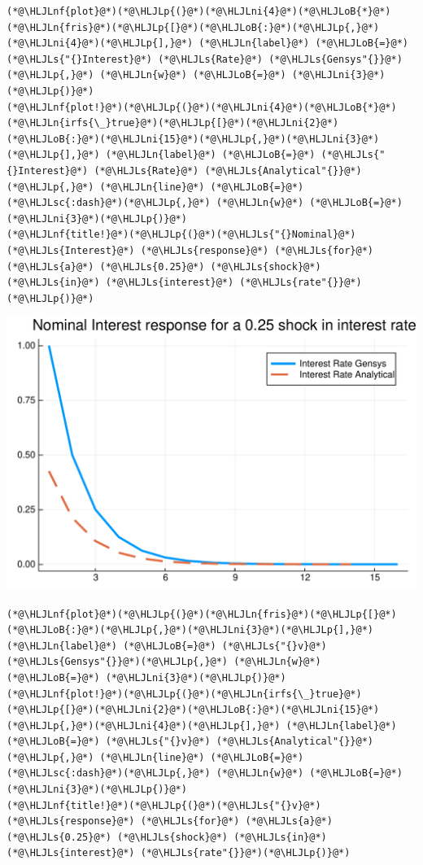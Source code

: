 \documentclass[12pt,a4paper]{article}
\newcommand{\HLJLn}[1]{#1}
\newcommand{\HLJLnf}[1]{\textcolor[RGB]{66,102,213}{#1}}
\newcommand{\HLJLs}[1]{\textcolor[RGB]{201,61,57}{#1}}
\newcommand{\HLJLsc}[1]{\textcolor[RGB]{201,61,57}{#1}}
\newcommand{\HLJLni}[1]{\textcolor[RGB]{59,151,46}{#1}}
\newcommand{\HLJLoB}[1]{\textcolor[RGB]{102,102,102}{\textbf{#1}}}
\newcommand{\HLJLp}[1]{#1}
\begin{document}
\begin{lstlisting}
(*@\HLJLnf{plot}@*)(*@\HLJLp{(}@*)(*@\HLJLni{4}@*)(*@\HLJLoB{*}@*)(*@\HLJLn{fris}@*)(*@\HLJLp{[}@*)(*@\HLJLoB{:}@*)(*@\HLJLp{,}@*)(*@\HLJLni{4}@*)(*@\HLJLp{],}@*) (*@\HLJLn{label}@*) (*@\HLJLoB{=}@*) (*@\HLJLs{"{}Interest}@*) (*@\HLJLs{Rate}@*) (*@\HLJLs{Gensys"{}}@*)(*@\HLJLp{,}@*) (*@\HLJLn{w}@*) (*@\HLJLoB{=}@*) (*@\HLJLni{3}@*)(*@\HLJLp{)}@*)
(*@\HLJLnf{plot!}@*)(*@\HLJLp{(}@*)(*@\HLJLni{4}@*)(*@\HLJLoB{*}@*)(*@\HLJLn{irfs{\_}true}@*)(*@\HLJLp{[}@*)(*@\HLJLni{2}@*)(*@\HLJLoB{:}@*)(*@\HLJLni{15}@*)(*@\HLJLp{,}@*)(*@\HLJLni{3}@*)(*@\HLJLp{],}@*) (*@\HLJLn{label}@*) (*@\HLJLoB{=}@*) (*@\HLJLs{"{}Interest}@*) (*@\HLJLs{Rate}@*) (*@\HLJLs{Analytical"{}}@*)(*@\HLJLp{,}@*) (*@\HLJLn{line}@*) (*@\HLJLoB{=}@*) (*@\HLJLsc{:dash}@*)(*@\HLJLp{,}@*) (*@\HLJLn{w}@*) (*@\HLJLoB{=}@*) (*@\HLJLni{3}@*)(*@\HLJLp{)}@*)
(*@\HLJLnf{title!}@*)(*@\HLJLp{(}@*)(*@\HLJLs{"{}Nominal}@*) (*@\HLJLs{Interest}@*) (*@\HLJLs{response}@*) (*@\HLJLs{for}@*) (*@\HLJLs{a}@*) (*@\HLJLs{0.25}@*) (*@\HLJLs{shock}@*) (*@\HLJLs{in}@*) (*@\HLJLs{interest}@*) (*@\HLJLs{rate"{}}@*)(*@\HLJLp{)}@*)
\end{lstlisting}

\includegraphics[width=\linewidth]{figures/gensys_22_1.pdf}

\begin{lstlisting}
(*@\HLJLnf{plot}@*)(*@\HLJLp{(}@*)(*@\HLJLn{fris}@*)(*@\HLJLp{[}@*)(*@\HLJLoB{:}@*)(*@\HLJLp{,}@*)(*@\HLJLni{3}@*)(*@\HLJLp{],}@*) (*@\HLJLn{label}@*) (*@\HLJLoB{=}@*) (*@\HLJLs{"{}v}@*) (*@\HLJLs{Gensys"{}}@*)(*@\HLJLp{,}@*) (*@\HLJLn{w}@*) (*@\HLJLoB{=}@*) (*@\HLJLni{3}@*)(*@\HLJLp{)}@*)
(*@\HLJLnf{plot!}@*)(*@\HLJLp{(}@*)(*@\HLJLn{irfs{\_}true}@*)(*@\HLJLp{[}@*)(*@\HLJLni{2}@*)(*@\HLJLoB{:}@*)(*@\HLJLni{15}@*)(*@\HLJLp{,}@*)(*@\HLJLni{4}@*)(*@\HLJLp{],}@*) (*@\HLJLn{label}@*) (*@\HLJLoB{=}@*) (*@\HLJLs{"{}v}@*) (*@\HLJLs{Analytical"{}}@*)(*@\HLJLp{,}@*) (*@\HLJLn{line}@*) (*@\HLJLoB{=}@*) (*@\HLJLsc{:dash}@*)(*@\HLJLp{,}@*) (*@\HLJLn{w}@*) (*@\HLJLoB{=}@*) (*@\HLJLni{3}@*)(*@\HLJLp{)}@*)
(*@\HLJLnf{title!}@*)(*@\HLJLp{(}@*)(*@\HLJLs{"{}v}@*) (*@\HLJLs{response}@*) (*@\HLJLs{for}@*) (*@\HLJLs{a}@*) (*@\HLJLs{0.25}@*) (*@\HLJLs{shock}@*) (*@\HLJLs{in}@*) (*@\HLJLs{interest}@*) (*@\HLJLs{rate"{}}@*)(*@\HLJLp{)}@*)
\end{lstlisting}
\end{document}
